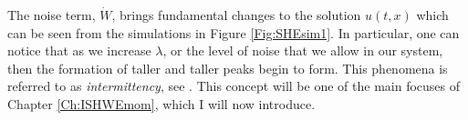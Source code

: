 \documentclass[12pt]{report}
\theoremstyle{plain}
\theoremstyle{definition}
\numberwithin{equation}{section}
\begin{document}

The noise term, $\dot{W}$, brings fundamental changes to the solution $u(t,x)$ which can be seen from the simulations in Figure \ref{Fig:SHEsim1}. In particular, one can notice that as we increase $\lambda$, or the level of noise that we allow in our system, then the formation of taller and taller peaks begin to form. This phenomena is referred to as {\em intermittency}, see \cite{chen.kim:19:nonlinear, khoshnevisan.kim:15:non-linear, carmona.molchanov:95:stationary}. This concept will be one of the main focuses of Chapter \ref{Ch:ISHWEmom}, which I will now introduce.
\end{document}
